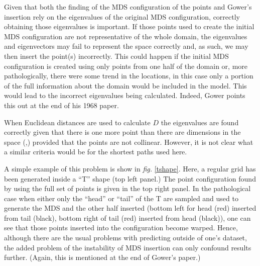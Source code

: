 \documentclass[a4paper,10pt]{article}
\newcommand{\fig}[1]{\emph{fig.} \ref{#1}}
\begin{document}
Given that both the finding of the MDS configuration of the points and Gower's insertion rely on the eigenvalues of the original MDS configuration, correctly obtaining those eigenvalues is important. If those points used to create the initial MDS configuration are not representative of the whole domain, the eigenvalues and eigenvectors may fail to represent the space correctly and, as such, we may then insert the point(s) incorrectly. This could happen if the initial MDS configuration is created using only points from one half of the domain or, more pathologically, there were some trend in the locations, in this case only a portion of the full information about the domain would be included in the model. This would lead to the incorrect eigenvalues being calculated. Indeed, Gower points this out at the end of his 1968 paper.

When Euclidean distances are used to calculate $D$ the eigenvalues are found correctly given that there is one more point than there are dimensions in the space (\cite{landmark},) provided that the points are not collinear. However, it is not clear what a similar criteria would be for the shortest paths used here. 

A simple example of this problem is show in \fig{tshape}. Here, a regular grid has been generated inside a ``T'' shape (top left panel.) The point configuration found by using the full set of points is given in the top right panel. In the pathological case when either only the ``head'' or ``tail'' of the T are sampled and used to generate the MDS and the other half inserted (bottom left for head (red) inserted from tail (black), bottom right of tail (red) inserted from head (black)), one can see that those points inserted into the configuration become warped. Hence, although there are the usual problems with predicting outside of one's dataset, the added problem of the instability of MDS insertion can only confound results further. (Again, this is mentioned at the end of Gower's paper.)
\end{document}
